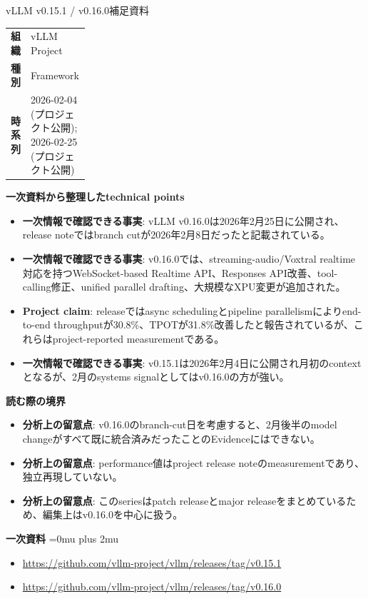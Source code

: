 \begin{technicalnote}{vLLM v0.15.1 / v0.16.0}{補足資料}
\begingroup
\begin{tabularx}{\linewidth}{@{}>{\bfseries}p{0.22\linewidth}X@{}}
組織 & vLLM Project \\
種別 & Framework \\
時系列 & 2026-02-04 (プロジェクト公開); 2026-02-25 (プロジェクト公開) \\
\end{tabularx}
\smallskip
{\bfseries 一次資料から整理したtechnical points}
\begin{itemize}[leftmargin=1.5em,itemsep=0.35em]
\item \textbf{一次情報で確認できる事実}: vLLM v0.16.0は2026年2月25日に公開され、release noteではbranch cutが2026年2月8日だったと記載されている。
\item \textbf{一次情報で確認できる事実}: v0.16.0では、streaming-audio/Voxtral realtime対応を持つWebSocket-based Realtime API、Responses API改善、tool-calling修正、unified parallel drafting、大規模なXPU変更が追加された。
\item \textbf{Project claim}: releaseではasync schedulingとpipeline parallelismによりend-to-end throughputが30.8\%、TPOTが31.8\%改善したと報告されているが、これらはproject-reported measurementである。
\item \textbf{一次情報で確認できる事実}: v0.15.1は2026年2月4日に公開され月初のcontextとなるが、2月のsystems signalとしてはv0.16.0の方が強い。
\end{itemize}
\begin{minipage}{\linewidth}
{\bfseries 読む際の境界}
\begin{itemize}[leftmargin=1.5em,itemsep=0.35em]
\item \textbf{分析上の留意点}: v0.16.0のbranch-cut日を考慮すると、2月後半のmodel changeがすべて既に統合済みだったことのEvidenceにはできない。
\item \textbf{分析上の留意点}: performance値はproject release noteのmeasurementであり、独立再現していない。
\item \textbf{分析上の留意点}: このseriesはpatch releaseとmajor releaseをまとめているため、編集上はv0.16.0を中心に扱う。
\end{itemize}
\begin{samepage}
{\bfseries 一次資料}
\begingroup\sloppy
\Urlmuskip=0mu plus 2mu\relax
\begin{itemize}[leftmargin=1.5em,itemsep=0.25em]
\item {\scriptsize\url{https://github.com/vllm-project/vllm/releases/tag/v0.15.1}}
\item {\scriptsize\url{https://github.com/vllm-project/vllm/releases/tag/v0.16.0}}
\end{itemize}
\endgroup
\end{samepage}
\end{minipage}
\endgroup
\end{technicalnote}
\medskip
